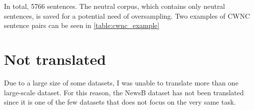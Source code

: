 


In total, 5766 sentences. The neutral corpus, which contains only neutral sentences, is saved for a potential need of oversampling. Two examples of CWNC sentence pairs can be seen in \ref{table:cwnc_example}





\section{Not translated}
Due to a large size of some datasets, I was unable to translate more than one large-scale dataset. For this reason, the NewsB dataset has not been translated since it is one of the few datasets that does not focus on the very same task.